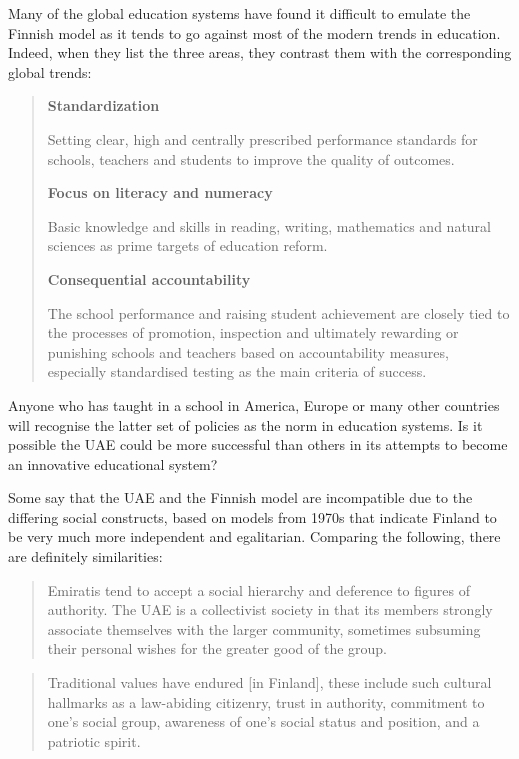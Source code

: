 Many of the global education systems have found it difficult to emulate the Finnish model as it tends to go against most of the modern trends in education. Indeed, when they list the three areas, they contrast them with the corresponding global trends:

\begin{quote}
\textbf{Standardization}

Setting clear, high and centrally prescribed performance standards for schools, teachers and students to improve the quality of outcomes.


\textbf{Focus on literacy and numeracy}

Basic knowledge and skills in reading, writing, mathematics and natural sciences as prime targets of education reform.


\textbf{Consequential accountability} 

The school performance and raising student achievement are closely tied to the processes of promotion, inspection and ultimately rewarding or punishing schools and teachers based on accountability measures, especially standardised testing as the main criteria of success.
\end{quote}

Anyone who has taught in a school in America, Europe or many other countries will recognise the latter set of policies as the norm in education systems. Is it possible the UAE could be more successful than others in its attempts to become an innovative educational system?

Some \cite{Hatherley-Greene2016} say that the UAE and the Finnish model are incompatible due to the differing social constructs, based on models from 1970s that indicate Finland to be very much more independent and egalitarian. Comparing the following, there are definitely similarities:

\begin{quote}
Emiratis tend to accept a social hierarchy and deference to figures of authority. The UAE is a collectivist society in that its members strongly associate themselves with the larger community, sometimes subsuming their personal wishes for the greater good of the group.
\end{quote} \cite{Hatherley-Greene2016}

\begin{quote}
Traditional values have endured [in Finland], these include such cultural hallmarks as a law-abiding citizenry, trust in authority, commitment to one’s social group, awareness of one’s social status and position, and a patriotic spirit.
\end{quote} \cite{Sahlberg2007}

